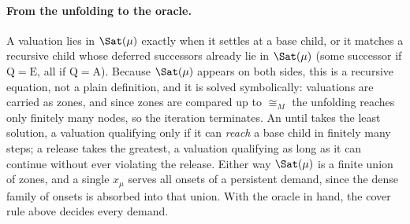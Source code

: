 \paragraph{From the unfolding to the oracle.}
A valuation lies in $\Sat(\mu)$ exactly when it settles at a base child, or it matches a recursive child
whose deferred successors already lie in $\Sat(\mu)$ (some successor if $\mathrm{Q}=\mathrm{E}$, all if
$\mathrm{Q}=\mathrm{A}$). Because $\Sat(\mu)$ appears on both sides, this is a recursive equation, not a
plain definition, and it is solved symbolically: valuations are carried as zones, and since zones are
compared up to $\cong_M$ the unfolding reaches only finitely many nodes, so the iteration terminates. An
until takes the least solution, a valuation qualifying only if it can \emph{reach} a base child in finitely
many steps; a release takes the greatest, a valuation qualifying as long as it can continue without ever
violating the release. Either way $\Sat(\mu)$ is a finite union of zones, and a single $x_\mu$ serves all
onsets of a persistent demand, since the dense family of onsets is absorbed into that union. With the
oracle in hand, the cover rule above decides every demand.
